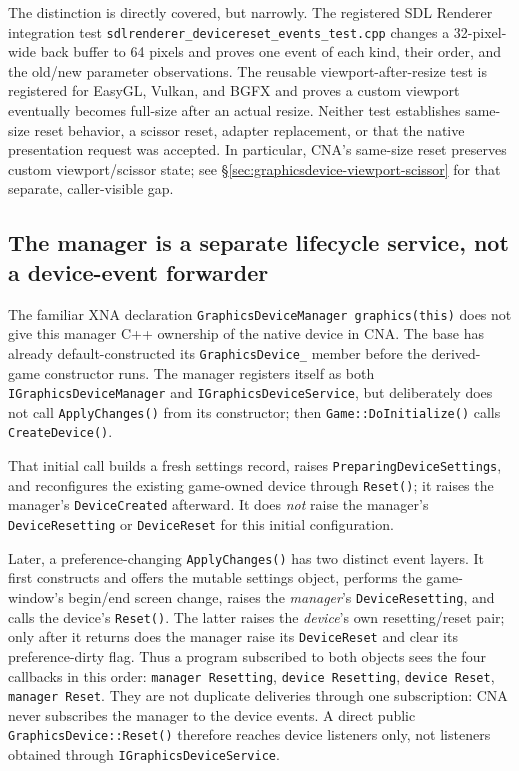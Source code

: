 The distinction is directly covered, but narrowly. The registered SDL Renderer integration
test \texttt{sdlrenderer\_devicereset\_events\_test.cpp} changes a 32-pixel-wide back buffer to
64 pixels and proves one event of each kind, their order, and the old/new parameter observations.
The reusable viewport-after-resize test is registered for EasyGL, Vulkan, and BGFX and proves a
custom viewport eventually becomes full-size after an actual resize. Neither test establishes
same-size reset behavior, a scissor reset, adapter replacement, or that the native presentation
request was accepted. In particular, CNA's same-size reset preserves custom viewport/scissor
state; see \S\ref{sec:graphicsdevice-viewport-scissor} for that separate, caller-visible gap.

\subsection{The manager is a separate lifecycle service, not a device-event forwarder}

The familiar XNA declaration \texttt{GraphicsDeviceManager graphics(this)} does not give this
manager C++ ownership of the native device in CNA. The  base has already
default-constructed its \texttt{GraphicsDevice\_} member before the derived-game constructor
runs. The manager registers itself as both \texttt{IGraphicsDeviceManager} and
\texttt{IGraphicsDeviceService}, but deliberately does not call \texttt{ApplyChanges()} from
its constructor; then \texttt{Game::DoInitialize()} calls \texttt{CreateDevice()}.

That initial call builds a fresh settings record, raises \texttt{PreparingDeviceSettings}, and
reconfigures the existing game-owned device through \texttt{Reset()}; it raises the manager's
\texttt{DeviceCreated} afterward. It does \emph{not} raise the manager's
\texttt{DeviceResetting} or \texttt{DeviceReset} for this initial configuration.

Later, a preference-changing \texttt{ApplyChanges()} has two distinct event layers. It first
constructs and offers the mutable settings object, performs the game-window's begin/end screen
change, raises the \emph{manager}'s \texttt{DeviceResetting}, and calls the device's
\texttt{Reset()}. The latter raises the \emph{device}'s own resetting/reset pair; only after it
returns does the manager raise its \texttt{DeviceReset} and clear its preference-dirty flag.
Thus a program subscribed to both objects sees the four callbacks in this order:
\texttt{manager Resetting}, \texttt{device Resetting}, \texttt{device Reset},
\texttt{manager Reset}. They are not duplicate deliveries through one subscription: CNA never
subscribes the manager to the device events. A direct public \texttt{GraphicsDevice::Reset()}
therefore reaches device listeners only, not listeners obtained through
\texttt{IGraphicsDeviceService}.

